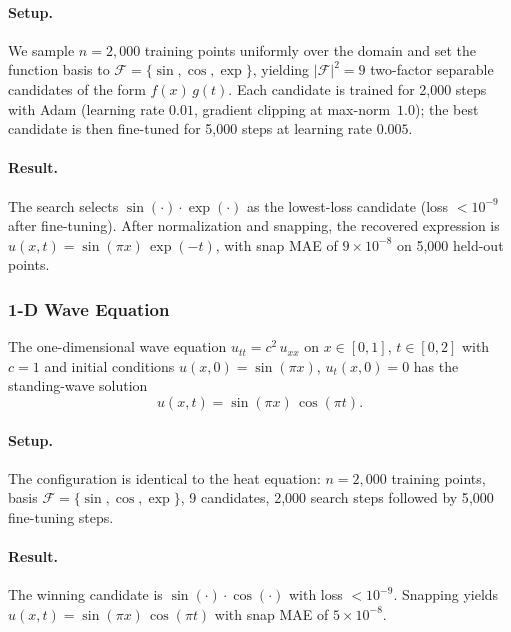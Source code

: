 \paragraph{Setup.}
We sample $n=2{,}000$ training points uniformly over the domain and set the
function basis to $\mathcal{F}=\{\sin,\cos,\exp\}$, yielding
$|\mathcal{F}|^2 = 9$ two-factor separable candidates of the form
$f(x)\,g(t)$.  Each candidate is trained for 2{,}000 steps with Adam
(learning rate $0.01$, gradient clipping at max-norm~$1.0$); the best
candidate is then fine-tuned for 5{,}000 steps at learning rate $0.005$.

\paragraph{Result.}
The search selects $\sin(\cdot)\!\cdot\!\exp(\cdot)$ as the lowest-loss
candidate (loss $< 10^{-9}$ after fine-tuning).  After normalization and
snapping, the recovered expression is
$\hat{u}(x,t) = \sin(\pi x)\,\exp(-t)$,
with snap MAE of $9\times 10^{-8}$ on 5{,}000 held-out points.

\subsubsection{1-D Wave Equation}
\label{sec:wave}

The one-dimensional wave equation $u_{tt} = c^{2}\,u_{xx}$ on $x\in[0,1]$,
$t\in[0,2]$ with $c=1$ and initial conditions $u(x,0)=\sin(\pi x)$,
$u_t(x,0)=0$ has the standing-wave solution
\begin{equation}
  u(x,t) = \sin(\pi x)\,\cos(\pi t).
  \label{eq:wave_exact}
\end{equation}

\paragraph{Setup.}
The configuration is identical to the heat equation: $n=2{,}000$ training
points, basis $\mathcal{F}=\{\sin,\cos,\exp\}$, 9 candidates, 2{,}000 search
steps followed by 5{,}000 fine-tuning steps.

\paragraph{Result.}
The winning candidate is $\sin(\cdot)\!\cdot\!\cos(\cdot)$ with loss
$< 10^{-9}$.  Snapping yields
$\hat{u}(x,t)=\sin(\pi x)\,\cos(\pi t)$
with snap MAE of $5\times 10^{-8}$.

